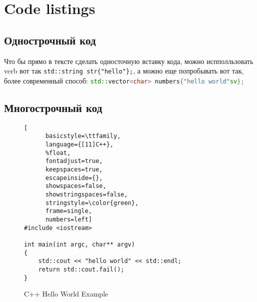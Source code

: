 \documentclass[a4paper,14pt]{book}
\begin{document}
\section{Code listings}
\subsection{Однострочный код}
Что бы прямо в тексте сделать односточную вставку кода, можно испполльзовать verb вот так \verb|std::string str{"hello"};|, а
можно еще попробывать вот так, более современный способ:
\lstinline[language=C++]!std::vector<char> numbers{"hello world"sv};!

\subsection{Многострочный код}

\begin{figure}
	\begin{lstlisting}[
	  basicstyle=\ttfamily,
	  language={[11]C++},
	  %float,
	  fontadjust=true,
	  keepspaces=true,
	  escapeinside={},
	  showspaces=false,
	  showstringspaces=false,
	  stringstyle=\color{green},
	  frame=single,
	  numbers=left]
#include <iostream>

int main(int argc, char** argv)
{
    std::cout << "hello world" << std::endl;
    return std::cout.fail();
}   \end{lstlisting}
	\caption{C++ Hello World Example}
	\label{lst:hello}
\end{figure}


\setcounter{tocdepth}{3}
\tableofcontents
\end{document}
